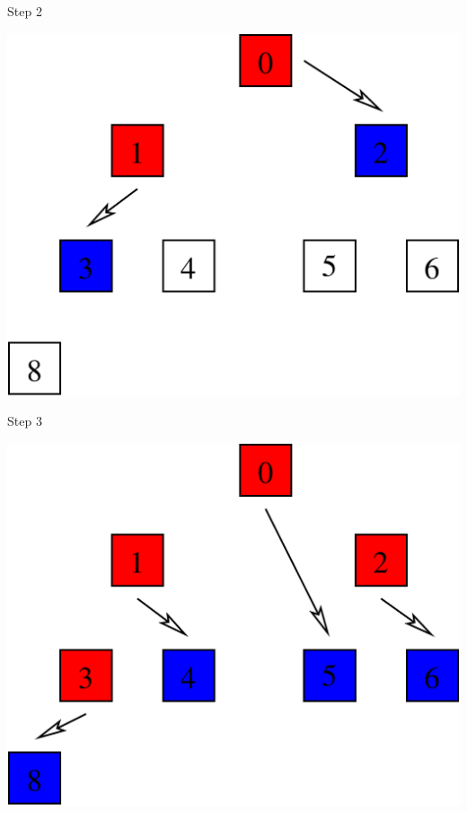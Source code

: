 \documentclass[compress,12pt]{beamer}
\begin{document}
\begin{frame}
{\begin{minipage}{.8\textwidth}
    \end{minipage}
  }
  {
    \begin{minipage}{.2\textwidth}
      Step 2
    \end{minipage}
    \begin{minipage}{.8\textwidth}
      \includegraphics[width=.7\textwidth]{figures/bcast1}
    \end{minipage}
  }
  {
    \begin{minipage}{.2\textwidth}
      Step 3
    \end{minipage}
    \begin{minipage}{.8\textwidth}
      \includegraphics[width=.7\textwidth]{figures/bcast2}
    \end{minipage}
  }
\end{frame}
\end{document}

